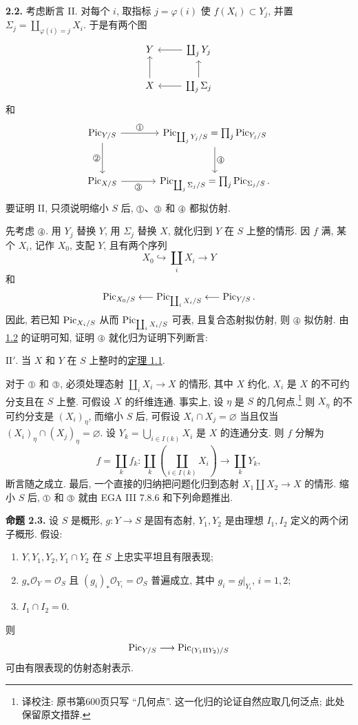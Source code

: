 \textbf{2.2.} 考虑断言 II. 对每个 $i$, 取指标 $j=\varphi(i)$ 使 $f(X_i)\subset Y_j$, 并置 $\Sigma_j=\coprod_{\varphi(i)=j}X_i$. 于是有两个图
\[
\begin{tikzcd}
Y & \coprod_jY_j \arrow[l]\\
X \arrow[u] & \coprod_j\Sigma_j \arrow[l] \arrow[u]
\end{tikzcd}
\]
和
\[
\begin{tikzcd}[column sep=large,row sep=large]
\Pic_{Y/S} \arrow[r,"\sgacircled{1}"] \arrow[d,"\sgacircled{2}"'] &
\Pic_{\coprod_jY_j/S}=\prod_j\Pic_{Y_j/S}
  \arrow[d,"\sgacircled{4}"]\\
\Pic_{X/S} \arrow[r,"\sgacircled{3}"'] &
\Pic_{\coprod_j\Sigma_j/S}=\prod_j\Pic_{\Sigma_j/S}.
\end{tikzcd}
\]
要证明 II, 只须说明缩小 $S$ 后, $\sgacircled{1}$、$\sgacircled{3}$ 和 $\sgacircled{4}$ 都拟仿射.

先考虑 $\sgacircled{4}$. 用 $Y_j$ 替换 $Y$, 用 $\Sigma_j$ 替换 $X$, 就化归到 $Y$ 在 $S$ 上整的情形. 因 $f$ 满, 某个 $X_i$, 记作 $X_0$, 支配 $Y$, 且有两个序列
\[
  X_0\hookrightarrow\coprod_iX_i\longrightarrow Y
\]
和
\[
  \operatorname{Pic}_{X_0/S}\longleftarrow\operatorname{Pic}_{\coprod_iX_i/S}
  \longleftarrow\operatorname{Pic}_{Y/S}.
\]
因此, 若已知 $\operatorname{Pic}_{X_i/S}$ 从而 $\operatorname{Pic}_{\coprod_iX_i/S}$ 可表, 且复合态射拟仿射, 则 $\sgacircled{4}$ 拟仿射. 由\hyperlink{sga6.e12.cor.1-2}{1.2} 的证明可知, 证明 $\sgacircled{4}$ 就化归为证明下列断言:

\medskip
\noindent
$\mathrm{II}'$. 当 $X$ 和 $Y$ 在 $S$ 上整时的\hyperlink{sga6.e12.thm.1-1}{定理 1.1}.
\medskip

对于 $\sgacircled{1}$ 和 $\sgacircled{3}$, 必须处理态射 $\coprod_iX_i\to X$ 的情形, 其中 $X$ 约化, $X_i$ 是 $X$ 的不可约分支且在 $S$ 上整. 可假设 $X$ 的纤维连通. 事实上, 设 $\eta$ 是 $S$ 的几何点.\footnote{译校注: 原书第600页只写 ``几何点''. 这一化归的论证自然应取几何泛点; 此处保留原文措辞.} 则 $X_\eta$ 的不可约分支是 $(X_i)_\eta$, 而缩小 $S$ 后, 可假设 $X_i\cap X_j=\varnothing$ 当且仅当 $(X_i)_\eta\cap(X_j)_\eta=\varnothing$. 设 $Y_k=\bigcup_{i\in I(k)}X_i$ 是 $X$ 的连通分支. 则 $f$ 分解为
\[
  f=\coprod_k f_k:
  \coprod_k\left(\coprod_{i\in I(k)}X_i\right)
  \longrightarrow\coprod_kY_k,
\]
断言随之成立. 最后, 一个直接的归纳把问题化归到态射 $X_1\amalg X_2\to X$ 的情形. 缩小 $S$ 后, $\sgacircled{1}$ 和 $\sgacircled{3}$ 就由 EGA III 7.8.6 和下列命题推出.

\textbf{命题 2.3.} 设 $S$ 是概形, $g:Y\to S$ 是固有态射, $Y_1,Y_2$ 是由理想 $I_1,I_2$ 定义的两个闭子概形. 假设:
\begin{enumerate}[label=\alph*)]
\item $Y,Y_1,Y_2,Y_1\cap Y_2$ 在 $S$ 上忠实平坦且有限表现;
\item $g_*\mathcal O_Y=\mathcal O_S$ 且 $(g_i)_*\mathcal O_{Y_i}=\mathcal O_S$ 普遍成立, 其中 $g_i=g|_{Y_i}$, $i=1,2$;
\item $I_1\cap I_2=0$.
\end{enumerate}
则
\[
  \operatorname{Pic}_{Y/S}\longrightarrow\operatorname{Pic}_{(Y_1\amalg Y_2)/S}
\]
可由有限表现的仿射态射表示.

